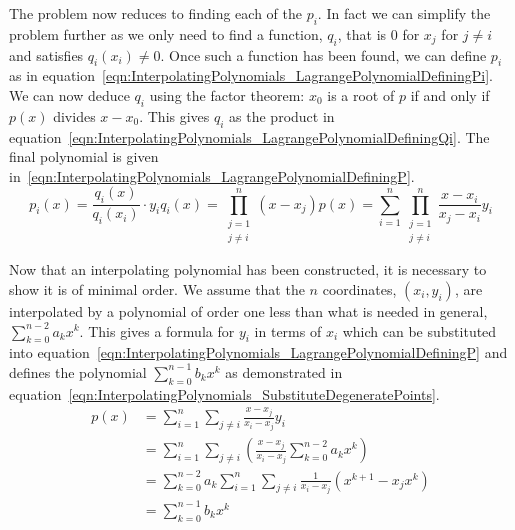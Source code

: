 The problem now reduces to finding each of the $p_i$. In fact we can simplify the problem further as we only need to find a function, $q_i$, that is $0$ for $x_j$ for $j \ne i$ and satisfies $q_i(x_i) \ne 0$. Once such a function has been found, we can define $p_i$ as in equation~\eqref{eqn:InterpolatingPolynomials_LagrangePolynomialDefiningPi}. We can now deduce $q_i$ using the factor theorem: $x_0$ is a root of $p$ if and only if $p(x)$ divides $x - x_0$. This gives $q_i$ as the product in equation~\eqref{eqn:InterpolatingPolynomials_LagrangePolynomialDefiningQi}. The final polynomial is given in~\eqref{eqn:InterpolatingPolynomials_LagrangePolynomialDefiningP}.
\begin{subequations}
	\begin{equation}
		p_i(x) = \frac{q_i(x)}{q_i(x_i)} \cdot y_i
		\label{eqn:InterpolatingPolynomials_LagrangePolynomialDefiningPi}
	\end{equation}
	\begin{equation}
		q_i(x) = \prod_{\substack{j=1 \\ j \ne i}}^n (x - x_j)
		\label{eqn:InterpolatingPolynomials_LagrangePolynomialDefiningQi}
	\end{equation}
	\begin{equation}
	p(x) = \sum_{i=1}^n \prod_{\substack{j=1 \\ j \ne i}}^n \frac{x - x_i}{x_j - x_i} y_i
	\label{eqn:InterpolatingPolynomials_LagrangePolynomialDefiningP}
	\end{equation}
\end{subequations}

Now that an interpolating polynomial has been constructed, it is necessary to show it is of minimal order. We assume that the $n$ coordinates, $(x_i, y_i)$, are interpolated by a polynomial of order one less than what is needed in general, $\sum_{k=0}^{n-2} a_k x^k$. This gives a formula for $y_i$ in terms of $x_i$ which can be substituted into equation~\eqref{eqn:InterpolatingPolynomials_LagrangePolynomialDefiningP} and defines the polynomial $\sum_{k=0}^{n-1} b_k x^k$ as demonstrated in equation~\eqref{eqn:InterpolatingPolynomials_SubstituteDegeneratePoints}.
\begin{subequations}
	\begin{align}
		p(x) &= \sum_{i=1}^n \sum_{j \ne i} \frac{x - x_j}{x_i - x_j} y_i  \\
		&= \sum_{i=1}^n \sum_{j \ne i} \left( \frac{x - x_j}{x_i - x_j} \sum_{k=0}^{n-2} a_k x^k \right)  \\
		&= \sum_{k=0}^{n-2} a_k \sum_{i=1}^n \sum_{j \ne i} \frac{1}{x_i - x_j} (x^{k+1} - x_j x^k)  \\
		&= \sum_{k=0}^{n-1} b_k x^k
	\end{align}
	\label{eqn:InterpolatingPolynomials_SubstituteDegeneratePoints}
\end{subequations}

